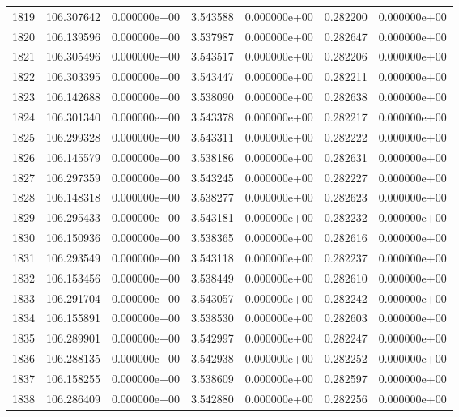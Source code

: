 \begin{tabular}{rrrrrrr}
1819 & 106.307642 &  0.000000e+00 &  3.543588 &  0.000000e+00 &    0.282200 &  0.000000e+00 \\
1820 & 106.139596 &  0.000000e+00 &  3.537987 &  0.000000e+00 &    0.282647 &  0.000000e+00 \\
1821 & 106.305496 &  0.000000e+00 &  3.543517 &  0.000000e+00 &    0.282206 &  0.000000e+00 \\
1822 & 106.303395 &  0.000000e+00 &  3.543447 &  0.000000e+00 &    0.282211 &  0.000000e+00 \\
1823 & 106.142688 &  0.000000e+00 &  3.538090 &  0.000000e+00 &    0.282638 &  0.000000e+00 \\
1824 & 106.301340 &  0.000000e+00 &  3.543378 &  0.000000e+00 &    0.282217 &  0.000000e+00 \\
1825 & 106.299328 &  0.000000e+00 &  3.543311 &  0.000000e+00 &    0.282222 &  0.000000e+00 \\
1826 & 106.145579 &  0.000000e+00 &  3.538186 &  0.000000e+00 &    0.282631 &  0.000000e+00 \\
1827 & 106.297359 &  0.000000e+00 &  3.543245 &  0.000000e+00 &    0.282227 &  0.000000e+00 \\
1828 & 106.148318 &  0.000000e+00 &  3.538277 &  0.000000e+00 &    0.282623 &  0.000000e+00 \\
1829 & 106.295433 &  0.000000e+00 &  3.543181 &  0.000000e+00 &    0.282232 &  0.000000e+00 \\
1830 & 106.150936 &  0.000000e+00 &  3.538365 &  0.000000e+00 &    0.282616 &  0.000000e+00 \\
1831 & 106.293549 &  0.000000e+00 &  3.543118 &  0.000000e+00 &    0.282237 &  0.000000e+00 \\
1832 & 106.153456 &  0.000000e+00 &  3.538449 &  0.000000e+00 &    0.282610 &  0.000000e+00 \\
1833 & 106.291704 &  0.000000e+00 &  3.543057 &  0.000000e+00 &    0.282242 &  0.000000e+00 \\
1834 & 106.155891 &  0.000000e+00 &  3.538530 &  0.000000e+00 &    0.282603 &  0.000000e+00 \\
1835 & 106.289901 &  0.000000e+00 &  3.542997 &  0.000000e+00 &    0.282247 &  0.000000e+00 \\
1836 & 106.288135 &  0.000000e+00 &  3.542938 &  0.000000e+00 &    0.282252 &  0.000000e+00 \\
1837 & 106.158255 &  0.000000e+00 &  3.538609 &  0.000000e+00 &    0.282597 &  0.000000e+00 \\
1838 & 106.286409 &  0.000000e+00 &  3.542880 &  0.000000e+00 &    0.282256 &  0.000000e+00 \\

\end{tabular}
